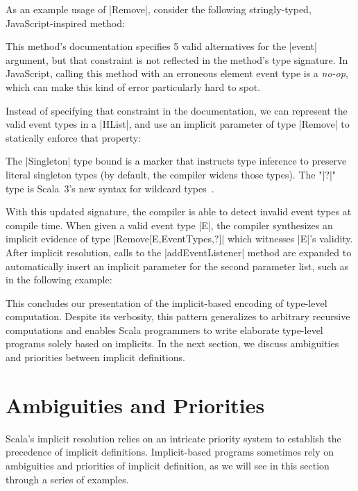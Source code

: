 As an example usage of |Remove|, consider the following stringly-typed, JavaScript-inspired method:

\addEventListenerJS

\noindent
This method's documentation specifies 5 valid alternatives for the |event| argument, but that constraint is not reflected in the method's type signature.
In JavaScript, calling this method with an erroneous element event type is a \emph{no-op}, which can make this kind of error particularly hard to spot.

Instead of specifying that constraint in the documentation, we can represent the valid event types in a |HList|, and use an implicit parameter of type |Remove| to statically enforce that property:

\addEventListenerImplicitDef

\noindent
The |Singleton| type bound is a marker that instructs type inference to preserve literal singleton types (by default, the compiler widens those types).
The "|?|" type is Scala~3's new syntax for wildcard types~\citep[Wildcard Arguments in Types]{odersky2013scala}.

With this updated signature, the compiler is able to detect invalid event types at compile time.
When given a valid event type |E|, the compiler synthesizes an implicit evidence of type |Remove[E,EventTypes,?]| which witnesses |E|'s validity.
After implicit resolution, calls to the |addEventListener| method are expanded to automatically insert an implicit parameter for the second parameter list, such as in the following example:

\addEventListenerImplicitCall

This concludes our presentation of the implicit-based encoding of type-level computation.
Despite its verbosity, this pattern generalizes to arbitrary recursive computations and enables Scala programmers to write elaborate type-level programs solely based on implicits.
In the next section, we discuss ambiguities and priorities between implicit definitions.

\section{Ambiguities and Priorities}

Scala's implicit resolution relies on an intricate priority system to establish the precedence of implicit definitions.
Implicit-based programs sometimes rely on ambiguities and priorities of implicit definition, as we will see in this section through a series of examples.

